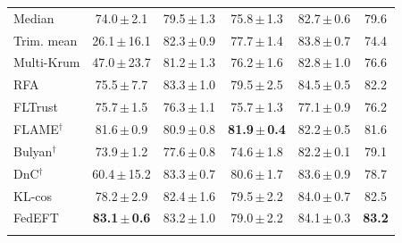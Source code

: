 \begin{table}[!tbp]
\begin{tabular}{@{}lccccc@{}}
Median & 74.0\,$\pm$\,2.1 & 79.5\,$\pm$\,1.3 & 75.8\,$\pm$\,1.3 & 82.7\,$\pm$\,0.6 & 79.6\\
Trim. mean & 26.1\,$\pm$\,16.1 & 82.3\,$\pm$\,0.9 & 77.7\,$\pm$\,1.4 & 83.8\,$\pm$\,0.7 & 74.4\\
Multi-Krum & 47.0\,$\pm$\,23.7 & 81.2\,$\pm$\,1.3 & 76.2\,$\pm$\,1.6 & 82.8\,$\pm$\,1.0 & 76.6\\
RFA & 75.5\,$\pm$\,7.7 & 83.3\,$\pm$\,1.0 & 79.5\,$\pm$\,2.5 & 84.5\,$\pm$\,0.5 & 82.2\\
FLTrust & 75.7\,$\pm$\,1.5 & 76.3\,$\pm$\,1.1 & 75.7\,$\pm$\,1.3 & 77.1\,$\pm$\,0.9 & 76.2\\
FLAME$^\dagger$ & 81.6\,$\pm$\,0.9 & 80.9\,$\pm$\,0.8 & \textbf{81.9\,$\pm$\,0.4} & 82.2\,$\pm$\,0.5 & 81.6\\
Bulyan$^\dagger$ & 73.9\,$\pm$\,1.2 & 77.6\,$\pm$\,0.8 & 74.6\,$\pm$\,1.8 & 82.2\,$\pm$\,0.1 & 79.1\\
DnC$^\dagger$ & 60.4\,$\pm$\,15.2 & 83.3\,$\pm$\,0.7 & 80.6\,$\pm$\,1.7 & 83.6\,$\pm$\,0.9 & 78.7\\
KL-cos & 78.2\,$\pm$\,2.9 & 82.4\,$\pm$\,1.6 & 79.5\,$\pm$\,2.2 & 84.0\,$\pm$\,0.7 & 82.5\\
\midrule
FedEFT & \textbf{83.1\,$\pm$\,0.6} & 83.2\,$\pm$\,1.0 & 79.0\,$\pm$\,2.2 & 84.1\,$\pm$\,0.3 & \textbf{83.2}\\
\botrule
\end{tabular}
\end{table}
